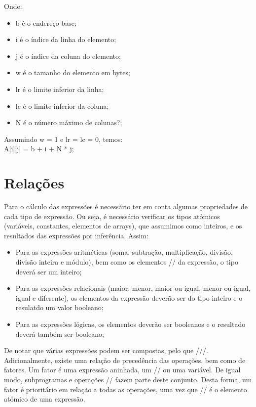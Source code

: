 Onde:

\begin{itemize}
\item b é o endereço base;
\item i é o índice da linha do elemento;
\item j é o índice da coluna do elemento;
\item w é o tamanho do elemento em bytes;
\item lr é o limite inferior da linha;
\item lc é o limite inferior da coluna;
\item N é o número máximo de colunas?;
\end{itemize}

Assumindo w = 1 e lr = lc = 0, temos:\\

A[i][j] = b + i + N * j;\\


\section{Relações}
\label{sec:relacoes:analise}

Para o cálculo das expressões é necessário ter em conta algumas propriedades de cada tipo de expressão. Ou seja, é necessário verificar os tipos atómicos (variáveis, constantes, elementos de arrays), que assumimos como inteiros, e os resultados das expressões por inferência. Assim:\\
\begin{itemize}
\item Para as expressões aritméticas (soma, subtração, multiplicação, divisão, divisão inteira e módulo), bem como os elementos // da expressão, o tipo deverá ser um inteiro;
\item Para as expressões relacionais (maior, menor, maior ou igual, menor ou igual, igual e diferente), os elementos da expressão deverão ser do tipo inteiro e o resulatdo um valor booleano;
\item Para as expressões lógicas, os elementos deverão ser booleanos e o resultado deverá também ser booleano;
\end{itemize}

De notar que várias expressões podem ser compostas, pelo que ///. Adicionalmente, existe uma relação de precedência das operações, bem como de fatores. Um fator é uma expressão aninhada, um // ou uma variável. De igual modo, subprogramas e operações // fazem parte deste conjunto. Desta forma, um fator é prioritário em relação a todas as operações, uma vez que // é o elemento atómico de uma expressão.\\

